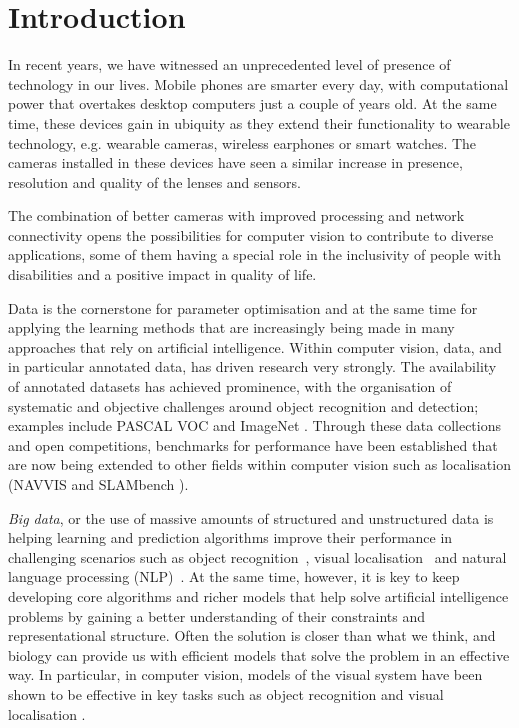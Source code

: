 \chapter{Introduction}\label{ch:introduction}

In recent years, we have witnessed an unprecedented level of presence of technology in our lives. Mobile phones are smarter every day, with computational power that overtakes desktop computers just a couple of years old. At the same time, these devices gain in ubiquity as they extend their functionality to wearable technology, e.g. wearable cameras, wireless earphones or smart watches. The cameras installed in these devices have seen a similar increase in presence, resolution and quality of the lenses and sensors.

The combination of better cameras with improved processing and network connectivity opens the possibilities for computer vision to contribute to diverse applications, some of them having a special role in the inclusivity of people with disabilities and a positive impact in quality of life.

Data is the cornerstone for parameter optimisation and at the same time for applying the learning methods that are increasingly being made in many approaches that rely on artificial intelligence. Within computer vision, data, and in particular annotated data, has driven research very strongly. The availability of annotated datasets has achieved prominence, with the organisation of systematic and objective challenges around object recognition and detection; examples include PASCAL VOC \cite{everingham2010pascal} and ImageNet \citep{Deng2009}. Through these data collections and open competitions, benchmarks for performance have been established that are now being extended to other fields within computer vision such as localisation (NAVVIS \cite{Huitl2012} and SLAMbench \cite{nardi2014introducing}).

\textit{Big data}, or the use of massive amounts of structured and unstructured data is helping learning and prediction algorithms improve their performance in challenging scenarios such as object recognition~\cite{krizhevsky2012imagenet}, visual localisation~\cite{kendall2015convolutional, giustimachine} and natural language processing (NLP)~\cite{socher2014recursive}. At the same time, however, it is key to keep developing core algorithms and richer models that help solve artificial intelligence problems by gaining a better understanding of their constraints and representational structure. Often the solution is closer than what we think, and biology can provide us with efficient models that solve the problem in an effective way. In particular, in computer vision, models of the visual system have been shown to be effective in key tasks such as object recognition and visual localisation \cite{lowe2004distinctive,milford2004ratslam}. 


